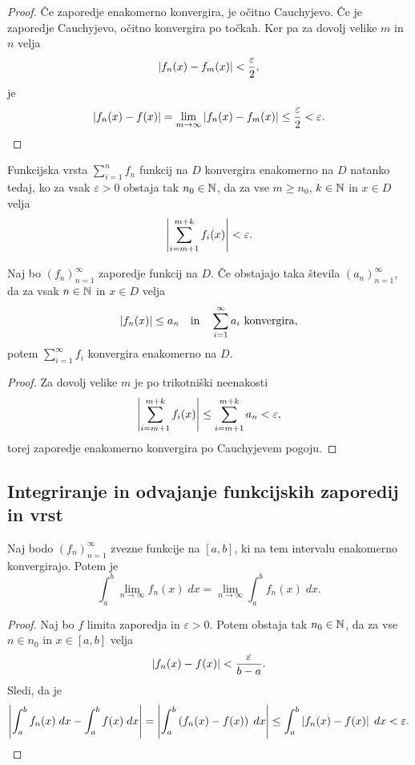 \documentclass[12pt, a4paper]{article}
\begin{document}
\begin{proof}
Če zaporedje enakomerno konvergira, je očitno Cauchyjevo. Če je zaporedje Cauchyjevo, očitno konvergira po točkah. Ker pa za dovolj velike $m$ in $n$ velja
\[
\left\lvert f_n(x)-f_m(x)\right\rvert<\frac{\varepsilon}{2},
\]
je
\[
\left\lvert f_n(x)-f(x)\right\rvert=\lim_{m\to\infty}\left\lvert f_n(x)-f_m(x)\right\rvert\leq\frac{\varepsilon}{2}<\varepsilon.\qedhere
\]
\end{proof}

\begin{posledica}
Funkcijska vrsta $\displaystyle\sum_{i=1}^n f_n$ funkcij na $D$ konvergira enakomerno na $D$ natanko tedaj, ko za vsak $\varepsilon>0$ obstaja tak $n_0\in\mathbb{N}$, da za vse $m\geq n_0$, $k\in\mathbb{N}$ in $x\in D$ velja
\[
\left\lvert \sum_{i=m+1}^{m+k} f_i(x)\right\rvert<\varepsilon.
\]
\end{posledica}

\begin{izrek}
Naj bo $(f_n)_{n=1}^\infty$ zaporedje funkcij na $D$. Če obstajajo taka števila $(a_n)_{n=1}^\infty$, da za vsak $n\in\mathbb{N}$ in $x\in D$ velja
\[
\left\lvert f_n(x)\right\rvert\leq a_n\quad\text{in}\quad\sum_{i=1}^\infty a_i~\text{konvergira},
\]
potem $\displaystyle\sum_{i=1}^\infty f_i$ konvergira enakomerno na $D$.
\end{izrek}

\begin{proof}
Za dovolj velike $m$ je po trikotniški neenakosti
\[
\left\lvert \sum_{i=m+1}^{m+k} f_i(x)\right\rvert\leq\sum_{i=m+1}^{m+k} a_n<\varepsilon,
\]
torej zaporedje enakomerno konvergira po Cauchyjevem pogoju.
\end{proof}

\newpage

\subsection{Integriranje in odvajanje funkcijskih zaporedij in vrst}

\begin{izrek}
Naj bodo $(f_n)_{n=1}^\infty$ zvezne funkcije na $[a,b]$, ki na tem intervalu enakomerno konvergirajo. Potem je
\[
\int_a^b \lim_{n\to\infty} f_n(x)\;dx=\lim_{n\to\infty}\int_a^b f_n(x)\;dx.
\]
\end{izrek}

\begin{proof}
Naj bo $f$ limita zaporedja in $\varepsilon>0$. Potem obstaja tak $n_0\in\mathbb{N}$, da za vse $n\in n_0$ in $x\in [a,b]$ velja
\[
\left\lvert f_n(x)-f(x)\right\rvert<\frac{\varepsilon}{b-a}.
\]
Sledi, da je
\[
\left\lvert \int_a^b f_n(x)\;dx-\int_a^b f(x)\;dx\right\rvert=\left\lvert \int_a^b \left(f_n(x)-f(x)\right)\;dx\right\rvert\leq\int_a^b \left\lvert f_n(x)-f(x)\right\rvert\;dx<\varepsilon.\qedhere
\]
\end{proof}
\end{document}
